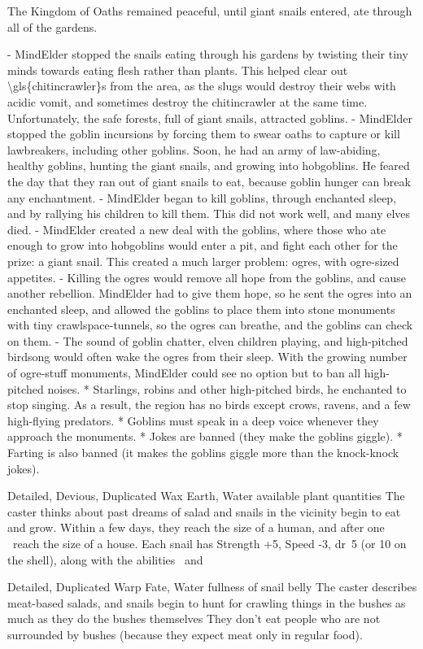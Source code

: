 The Kingdom of Oaths remained peaceful, until giant snails entered, ate through all of the gardens.

- MindElder stopped the snails eating through his gardens by twisting their tiny minds towards eating flesh rather than plants.  This helped clear out \glspl{\gls{chitincrawler}} from the area, as the slugs would destroy their webs with acidic vomit, and sometimes destroy the \gls{chitincrawler} at the same time.  Unfortunately, the safe forests, full of giant snails, attracted goblins.
- MindElder stopped the goblin incursions by forcing them to swear oaths to capture or kill lawbreakers, including other goblins.  Soon, he had an army of law-abiding, healthy goblins, hunting the giant snails, and growing into hobgoblins.  He feared the day that they ran out of giant snails to eat, because goblin hunger can break any enchantment.
- MindElder began to kill goblins, through enchanted sleep, and by rallying his children to kill them.  This did not work well, and many elves died.
- MindElder created a new deal with the goblins, where those who ate enough to grow into hobgoblins would enter a pit, and fight each other for the prize: a giant snail.  This created a much larger problem: ogres, with ogre-sized appetites.
- Killing the ogres would remove all hope from the goblins, and cause another rebellion.  MindElder had to give them hope, so he sent the ogres into an enchanted sleep, and allowed the goblins to place them into stone monuments with tiny crawlspace-tunnels, so the ogres can breathe, and the goblins can check on them.
- The sound of goblin chatter, elven children playing, and high-pitched birdsong would often wake the ogres from their sleep.  With the growing number of ogre-stuff monuments, MindElder could see no option but to ban all high-pitched noises.
    * Starlings, robins and other high-pitched birds, he enchanted to stop singing.  As a result, the region has no birds except crows, ravens, and a few high-flying predators.
    * Goblins must speak in a deep voice whenever they approach the monuments.
    * Jokes are banned (they make the goblins giggle).
    * Farting is also banned (it makes the goblins giggle more than the knock-knock jokes).



  {Detailed, Devious, Duplicated}%
  {Wax}%
  {Earth, Water}%
  {available plant quantities}%
  {The caster thinks about past dreams of salad and  snails in the vicinity begin to eat and grow.
  Within a few days, they reach the size of a human, and after one \showOnset\ reach the size of a house.
  Each snail has Strength +5, Speed -3, \gls{dr}~5 (or 10 on the shell), along with the abilities \viscid\ and \acidSpray}%
  {}

  {Detailed, Duplicated}%
  {Warp}%
  {Fate, Water}%
  {fullness of snail belly}%
  {The caster describes meat-based salads, and  snails begin to hunt for crawling things in the bushes as much as they do the bushes themselves}%
  {They don't eat people who are not surrounded by bushes (because they expect meat only in regular food).}



